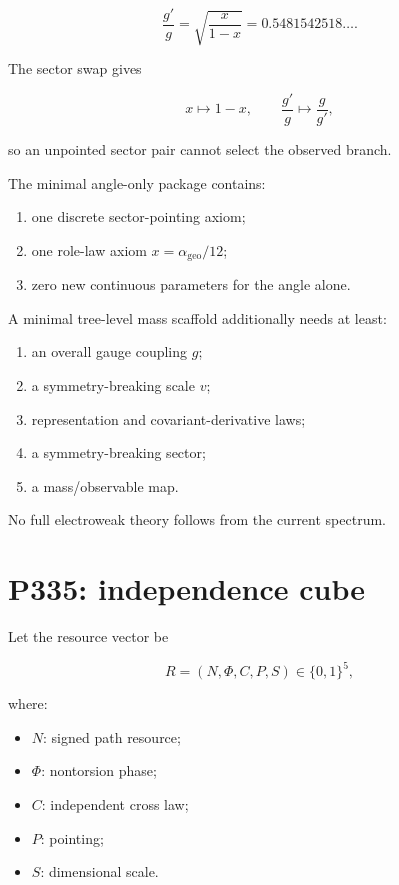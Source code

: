 \documentclass[11pt,a4paper,openany]{report}
\begin{document}
\[
\frac{g'}g
=\sqrt{\frac{x}{1-x}}
=0.5481542518\ldots.
\]

The sector swap gives

\[
x\mapsto1-x,
\qquad
\frac{g'}g\mapsto\frac g{g'},
\]

so an unpointed sector pair cannot select the observed branch.

The minimal angle-only package contains:

\begin{enumerate}
\item 
one discrete sector-pointing axiom;

\item 
one role-law axiom \(x=\alpha_{\mathrm{geo}}/12\);

\item 
zero new continuous parameters for the angle alone.

\end{enumerate}

A minimal tree-level mass scaffold additionally needs at least:

\begin{enumerate}
\item 
an overall gauge coupling \(g\);

\item 
a symmetry-breaking scale \(v\);

\item 
representation and covariant-derivative laws;

\item 
a symmetry-breaking sector;

\item 
a mass/\allowbreak{}observable map.

\end{enumerate}

No full electroweak theory follows from the current spectrum.

\section{P335: independence cube}

Let the resource vector be

\[
R=(N,\Phi,C,P,S)
\in\{0,1\}^5,
\]

where:

\begin{itemize}
\item 
\(N\): signed path resource;

\item 
\(\Phi\): nontorsion phase;

\item 
\(C\): independent cross law;

\item 
\(P\): pointing;

\item 
\(S\): dimensional scale.

\end{itemize}
\end{document}
